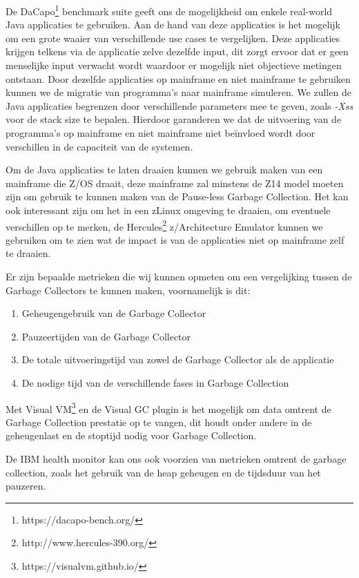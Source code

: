 De DaCapo\footnote{https://dacapo-bench.org/} benchmark suite geeft ons de mogelijkheid om enkele real-world Java applicaties te gebruiken.
Aan de hand van deze applicaties is het mogelijk om een grote waaier van verschillende use cases te vergelijken.
Deze applicaties krijgen telkens via de applicatie zelve dezelfde input, dit zorgt ervoor dat er geen menselijke input verwacht wordt waardoor er mogelijk niet objectieve metingen ontstaan.
Door dezelfde applicaties op mainframe en niet mainframe te gebruiken kunnen we de migratie van programma's naar mainframe simuleren.
We zullen de Java applicaties begrenzen door verschillende parameters mee te geven, zoals \textit{-Xss} voor de stack size te bepalen.
Hierdoor garanderen we dat de uitvoering van de programma's op mainframe en niet mainframe niet beïnvloed wordt door verschillen in de capaciteit van de systemen.

Om de Java applicaties te laten draaien kunnen we gebruik maken van een mainframe die Z/OS draait, deze mainframe zal minstens de Z14 model moeten zijn om gebruik te kunnen maken van de Pause-less Garbage Collection.
Het kan ook interessant zijn om het in een zLinux omgeving te draaien, om eventuele verschillen op te merken, de Hercules\footnote{http://www.hercules-390.org/} z/Architecture Emulator kunnen we gebruiken om te zien wat de impact is van de applicaties niet op mainframe zelf te draaien.

Er zijn bepaalde metrieken die wij kunnen opmeten om een vergelijking tussen de Garbage Collectors te kunnen maken, voornamelijk is dit:
\begin{enumerate}
    \item Geheugengebruik van de Garbage Collector
    \item Pauzeertijden van de Garbage Collector
    \item De totale uitvoeringstijd van zowel de Garbage Collector als de applicatie
    \item De nodige tijd van de verschillende fases in Garbage Collection
\end{enumerate}

Met Visual VM\footnote{https://visualvm.github.io/} en de Visual GC plugin is het mogelijk om data omtrent de Garbage Collection prestatie op te vangen, dit houdt onder andere in de geheugenlast en de stoptijd nodig voor Garbage Collection.


De IBM health monitor kan ons ook voorzien van metrieken omtrent de garbage collection, zoals het gebruik van de heap geheugen en de tijdsduur van het pauzeren. 



